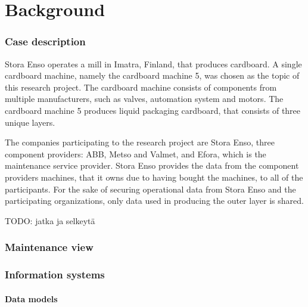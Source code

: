 \chapter{Background}
\label{chapter:background}

\subsection{Case description}

Stora Enso operates a mill in Imatra, Finland, that produces cardboard. A single cardboard machine, namely the cardboard machine 5, was chosen as the topic of this research project. The cardboard machine consists of components from multiple manufacturers, such as valves, automation system and motors. The cardboard machine 5 produces liquid packaging cardboard, that consists of three unique layers. 

The companies participating to the research project are Stora Enso, three component providers: ABB, Metso and Valmet, and Efora, which is the maintenance service provider. Stora Enso provides the data from the component providers machines, that it owns due to having bought the machines, to all of the participants. For the sake of securing operational data from Stora Enso and the participating organizations, only data used in producing the outer layer is shared.

TODO: jatka ja selkeytä









\subsection{Maintenance view}

\subsection{Information systems}

\subsubsection{Data models}
